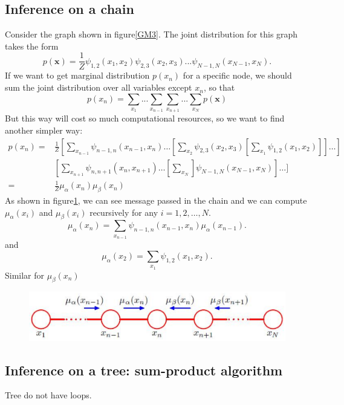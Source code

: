 \documentclass[a4paper]{book}
\renewcommand{\bf}{\mathbf}
\begin{document}
\subsection{Inference on a chain}
Consider the graph shown in figure\ref{GM3}. The joint distribution for this graph takes the form
\begin{equation}\label{eq8.16}
  p(\bf x) = \frac{1}{Z}\psi_{1,2}(x_1,x_2)\psi_{2,3}(x_2,x_3)...\psi_{N-1,N}(x_{N-1},x_N).
\end{equation}
If we want to get marginal distribution $p(x_n)$ for a specific node, we should sum the joint distribution over all variables except $x_n$, so that
\begin{equation}\label{eq8.17}
  p(x_n) = \sum_{x_1}...\sum_{x_{n-1}}\sum_{x_{n+1}}...\sum_{x_N}p(\bf x)
\end{equation}
But this way will cost so much computational resources, so we want to find another simpler way:
\begin{align}\label{eq8.18}
  p(x_n) =  & \frac{1}{Z}[\sum_{x_{n-1}}\psi_{n-1,n}(x_{n-1},x_n)\dots[\sum_{x_2}\psi_{2,3}(x_2,x_3)[\sum_{x_1}\psi_{1,2}(x_1,x_2)]]\dots] \\
   & [\sum_{x_{n+1}}\psi_{n,n+1}(x_n,x_{n+1})\dots[\sum_{x_N}]\psi_{N-1,N}(x_{N-1},x_{N})]\dots]  \\
   = & \frac{1}{Z}\mu_{\alpha}(x_n)\mu_{\beta}(x_n)
\end{align}
As shown in figure\ref{GM4}, we can see message passed in the chain and we can compute $\mu_{\alpha}(x_i)$ and $\mu_{\beta}(x_i)$ recursively for any $i=1, 2, \dots, N$.
\begin{equation}\label{eq8.19}
  \mu_{\alpha}(x_n) = \sum_{x_{n-1}}\psi_{n-1,n}(x_{n-1},x_n)\mu_{\alpha}(x_{n-1}).
\end{equation}
and
\begin{equation}\label{eq8.20}
  \mu_{\alpha}(x_2) = \sum_{x_1}\psi_{1,2}(x_1,x_2).
\end{equation}
Similar for $\mu_{\beta}(x_n)$
\begin{figure}[bth]
  \centering
  \includegraphics[width=\textwidth]{./imgs/GM4.eps}
  \caption{}\label{GM4}
\end{figure}
\subsection{Inference on a tree: sum-product algorithm}
Tree do not have loops.
\end{document}
